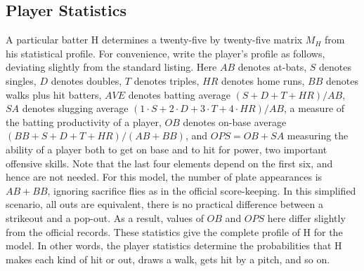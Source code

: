 \documentclass[12pt]{article}
\begin{document}
\subsection*{Player Statistics} A particular batter H determines a
twenty-five by twenty-five matrix \( M_{H} \) from his statistical
profile.  For convenience, write the player's profile as follows,
deviating slightly from the standard listing.  Here \( \mathit{AB} \)
denotes at-bats, \( S \) denotes singles, \( D \) denotes doubles, \( T \)
denotes triples, \( \mathit{HR} \) denotes home runs, \( \mathit{BB} \)
denotes walks plus hit batters, \( \mathit{AVE} \) denotes batting
average \( (S + D + T + \mathit{HR})/\mathit{AB} \), \( \mathit{SA} \)
denotes slugging average \( (1 \cdot S + 2 \cdot D + 3 \cdot T + 4 \cdot
\mathit{HR})/\mathit{AB} \), a measure of the batting productivity of a
player, \( \mathit{OB} \) denotes on-base average \( (\mathit{BB} + S +
D + T + \mathit{HR})/(\mathit{AB}+\mathit{BB}) \), and \( \mathit{OPS} =
\mathit{OB} + \mathit{SA} \) measuring the ability of a player both to
get on base and to hit for power, two important offensive skills.  Note
that the last four elements depend on the first six, and hence are not
needed.  For this model, the number of plate appearances is \( \mathit{AB}
+ \mathit{BB} \), ignoring sacrifice flies as in the official
score-keeping.  In this simplified scenario, all outs are equivalent,
there is no practical difference between a strikeout and a pop-out.  As
a result, values of \( \mathit{OB} \) and \( \mathit{OPS} \) here differ
slightly from the official records.  These statistics give the complete
profile of H for the model.  In other words, the player statistics
determine the probabilities that H makes each kind of hit or out, draws
a walk, gets hit by a pitch, and so on.
\end{document}
